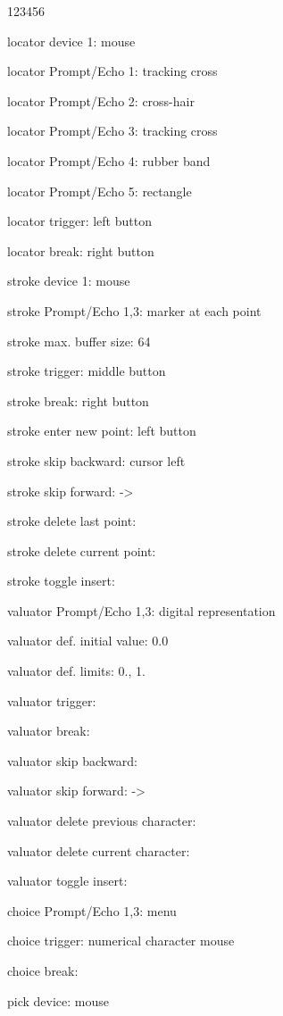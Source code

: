 \begin{DLtt}{123456}
\item[locator device 1:]mouse
\item[locator Prompt/Echo 1:]tracking cross
\item[locator Prompt/Echo 2:]cross-hair
\item[locator Prompt/Echo 3:]tracking cross
\item[locator Prompt/Echo 4:]rubber band
\item[locator Prompt/Echo 5:]rectangle
\item[locator trigger:]left button
\item[locator break:]right button
\item[stroke device 1:]mouse
\item[stroke Prompt/Echo 1,3:]marker at each point
\item[stroke max. buffer size:]64
\item[stroke trigger:]middle button
\item[stroke break:]right button
\item[stroke enter new point:]left button
\item[stroke skip backward:]cursor left
\item[stroke skip forward:]->
\item[stroke delete last point:]
\item[stroke delete current point:]
\item[stroke toggle insert:]
\item[valuator Prompt/Echo 1,3:]digital representation
\item[valuator def. initial value:]0.0
\item[valuator def. limits:]0., 1.
\item[valuator trigger:]
\item[valuator break:]
\item[valuator skip backward:]\Lit{<-}
\item[valuator skip forward:]->
\item[valuator delete previous character:]
\item[valuator delete current character:]
\item[valuator toggle insert:]
\item[choice Prompt/Echo 1,3:]menu
\item[choice trigger:]numerical character  mouse
\item[choice break:]
\item[pick device:]mouse

\end{DLtt}
